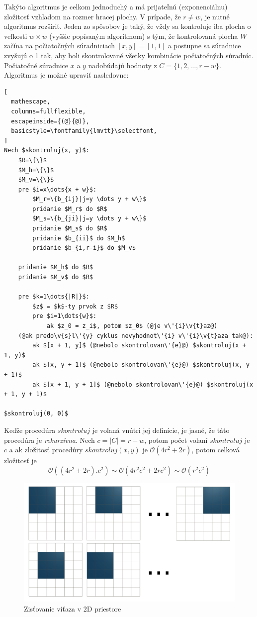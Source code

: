 Takýto algoritmus je celkom jednoduchý a má prijateľnú (exponenciálnu) zložitosť vzhľadom na rozmer hracej plochy.
V prípade, že $r \neq w$, je nutné algoritmus rozšíriť.
Jeden zo spôsobov je taký, že vždy sa kontroluje iba plocha o veľkosti $w \times w$ (vyššie popísaným algoritmom) s
tým, že kontrolovaná plocha $W$ začína na počiatočných súradniciach $[x,y]=[1,1]$ a postupne sa súradnice zvyšujú o 1
tak, aby boli skontrolované všetky kombinácie počiatočných súradníc.
Počiatočné súradnice $x$ a $y$ nadobúdajú hodnoty z $C = \{1, 2, \dots, r - w\}$.
Algoritmus je možné upraviť nasledovne:
\begin{lstlisting}[
  mathescape,
  columns=fullflexible,
  escapeinside={(@}{@)},
  basicstyle=\fontfamily{lmvtt}\selectfont,
]
Nech $skontroluj(x, y)$:
    $R=\{\}$
    $M_h=\{\}$
    $M_v=\{\}$
    pre $i=x\dots{x + w}$:
        $M_r=\{b_{ij}|j=y \dots y + w\}$
        pridanie $M_r$ do $R$
        $M_s=\{b_{ji}|j=y \dots y + w\}$
        pridanie $M_s$ do $R$
        pridanie $b_{ii}$ do $M_h$
        pridanie $b_{i,r-i}$ do $M_v$

    pridanie $M_h$ do $R$
    pridanie $M_v$ do $R$

    pre $k=1\dots{|R|}$:
        $z$ = $k$-ty prvok z $R$
        pre $i=1\dots{w}$:
            ak $z_0 = z_i$, potom $z_0$ (@je v\'{i}\v{t}az@)
    (@ak predo\v{s}l\'{y} cyklus nevyhodnot\'{i} v\'{i}\v{t}aza tak@):
        ak $[x + 1, y]$ (@nebolo skontrolovan\'{e}@) $skontroluj(x + 1, y)$
        ak $[x, y + 1]$ (@nebolo skontrolovan\'{e}@) $skontroluj(x, y + 1)$
        ak $[x + 1, y + 1]$ (@nebolo skontrolovan\'{e}@) $skontroluj(x + 1, y + 1)$

$skontroluj(0, 0)$
\end{lstlisting}
Keďže procedúra $skontroluj$ je volaná vnútri jej definície, je jasné, že táto procedúra je \emph{rekurzívna}.
Nech $c = |C| = r - w$, potom počet volaní $skontroluj$ je $c$ a ak zložitosť procedúry $skontroluj(x, y)$ je
$\mathcal{O}(4r^2 + 2r)$, potom celková zložitosť je
\begin{equation}
    \mathcal{O}((4r^2 + 2r).c^2) \sim \mathcal{O}(4r^2c^2 + 2rc^2) \sim \mathcal{O}(r^2c^2)
\end{equation}

\begin{figure}[H]
    \centering
    \includegraphics[width=1\textwidth]{images/winner-2D.png}
    \caption{Zisťovanie víťaza v 2D priestore}
\end{figure}

